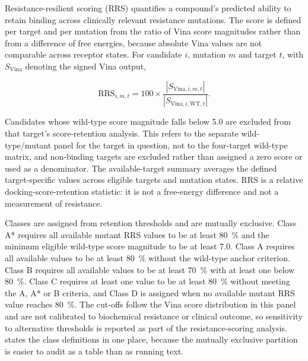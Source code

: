 Resistance-resilient scoring (RRS) quantifies a compound's predicted ability to retain binding across clinically relevant resistance mutations. The score is defined per target and per mutation from the ratio of Vina score magnitudes rather than from a difference of free energies, because absolute Vina values are not comparable across receptor states. For candidate $i$, mutation $m$ and target $t$, with $S_{\mathrm{Vina}}$ denoting the signed Vina output,

\begin{equation}
\mathrm{RRS}_{i,m,t} = 100 \times \frac{\left| S_{\mathrm{Vina},i,m,t} \right|}{\left| S_{\mathrm{Vina},i,\mathrm{WT},t} \right|}.
\label{eq:rrs}
\end{equation}

Candidates whose wild-type score magnitude falls below \qty{5.0}{\kcalmol} are excluded from that target's score-retention analysis. This refers to the separate wild-type/mutant panel for the target in question, not to the four-target wild-type matrix, and non-binding targets are excluded rather than assigned a zero score or used as a denominator. The available-target summary averages the defined target-specific values across eligible targets and mutation states. RRS is a relative docking-score-retention statistic: it is not a free-energy difference and not a measurement of resistance.

Classes are assigned from retention thresholds and are mutually exclusive. Class A* requires all available mutant RRS values to be at least \qty{80}{\percent} and the minimum eligible wild-type score magnitude to be at least \qty{7.0}{\kcalmol}. Class A requires all available values to be at least \qty{80}{\percent} without the wild-type anchor criterion. Class B requires all available values to be at least \qty{70}{\percent} with at least one below \qty{80}{\percent}. Class C requires at least one value to be at least \qty{80}{\percent} without meeting the A, A* or B criteria, and Class D is assigned when no available mutant RRS value reaches \qty{80}{\percent}. The cut-offs follow the Vina score distribution in this panel and are not calibrated to biochemical resistance or clinical outcome, so sensitivity to alternative thresholds is reported as part of the resistance-scoring analysis.  states the class definitions in one place, because the mutually exclusive partition is easier to audit as a table than as running text.

